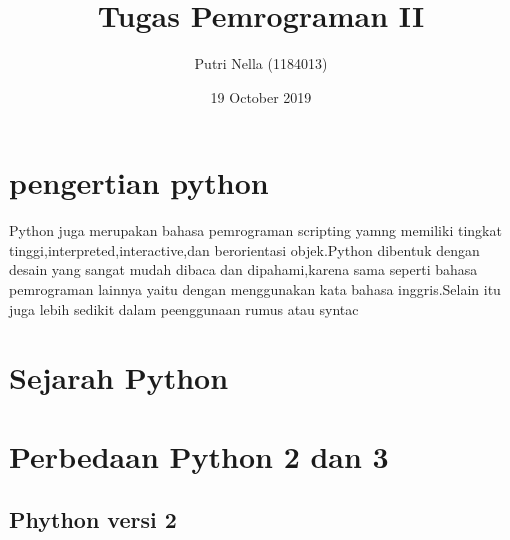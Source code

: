 \documentclass{article}
\title{Tugas Pemrograman II}
\author{Putri Nella (1184013)}
\date{19 October 2019}
\begin{document}
\maketitle
\begin{center}
    
\end{center}

\section{pengertian python}
\usepackage{Python merupakan bahasa pemrograman tingkat tinggi serta multiguna dimana perancangan berfokus pada bagaimana kode terbaca.Bahasa pemrograman Python disebut juga bahasa yang kemampuan yang dapat menggabungkan kapabilitas dengan sintaksis kode yang jelas demgam dilengkapi fungsional pustaka standar.}

{Python juga merupakan bahasa pemrograman scripting yamng memiliki tingkat tinggi,interpreted,interactive,dan berorientasi objek.Python dibentuk dengan desain yang sangat mudah dibaca dan dipahami,karena sama seperti bahasa pemrograman lainnya yaitu dengan menggunakan kata bahasa inggris.Selain itu juga lebih sedikit dalam peenggunaan rumus atau syntac}
\section{Sejarah Python}
\usepackage{Sejarah penemuan python berawal dari orang keturunan belanda yaitu Guido van Rossum.Pembuatan bahasa pemrograman python ini berlangsung di kota amsterdam Belanda pada tahun 1995.Pyhthon dikembangkan ladi agar lebih kompatibel oleh Goido Van Rossum.Kemudian pada awal tahun 2000,terdapat pembaharuan vwrsi Python hingga mencapai versi 3 sampai saat ini.Nama Python sendiri diambil dari sebuah acara televisi yang lumayan terkenal yang bernama Mothy Python Flying Circus yang merupakan acara sirkus favorit dari Goido Van Rossum.}
\section{Perbedaan Python 2 dan 3}
\usepackage{Ada dua python yang popular saat ini,yaitu python versi 2 dan python versi 3,berikut adalah perbedaan python versi 2 dan 3.}
\subsection{Phython versi 2}
\usepackage{dipublikasikan pada akhir tahun 2000, Python 2 dinilai akan lebih transparan dan inklusif untuk pengembangan software dibandingkan versi sebelumnya.Ini didukung dengan adanya PEP – Python Enhancement Proposal,yang merupakan spesifikasi teknis menjadi tuntunan informasi untuk penggunanya dan menggambarkan fitur baru di Python itu sendiri.
Python 2 juga dilengkapi dengan berbagai fitur programatikal seperti cycle-detecting garbage collector untuk mengotomasi manajemen memori, peningkatan dukungan untuk Unicode, list comprehension untuk membuat sebuah list berdasarkan list yang sudah ada. Unifikasi pada tipe data Python dan class ke satu hirarki terjadi pada rilis Python 2.2}
\end{document}
